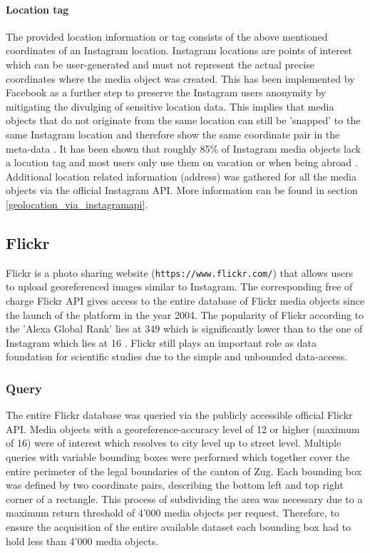 \paragraph{Location tag} \label{instagram_location_tag}
The provided location information or tag consists of the above mentioned coordinates of an Instagram location. Instagram locations are points of interest which can be user-generated and must not represent the actual precise coordinates where the media object was created. This has been implemented by Facebook as a further step to preserve the Instagram users anonymity by mitigating the divulging of sensitive location data. This implies that media objects that do not originate from the same location can still be 'snapped' to the same Instagram location and therefore show the same coordinate pair in the meta-data \parencite{Instagram}.
It has been shown that roughly 85\% of Instagram media objects lack a location tag and most users only use them on vacation or when being abroad \parencite{Flatow2015}.
Additional location related information (address) was gathered for all the media objects via the official Instagram API. More information can be found in section \ref{geolocation_via_instagramapi}.

\subsection{Flickr} \label{flickr}
Flickr is a photo sharing website (\texttt{https://www.flickr.com/}) that allows users to upload georeferenced images similar to Instagram. The corresponding free of charge Flickr API gives access to the entire database of Flickr media objects since the launch of the platform in the year 2004. The popularity of Flickr according to the 'Alexa Global Rank' lies at 349 \parencite{Alexa.com2019a} which is significantly lower than to the one of Instagram which lies at 16 \parencite{Alexa.com2019}. Flickr still plays an important role as data foundation for scientific studies due to the simple and unbounded data-access. 
\subsubsection{Query} \label{flickr_query}
The entire Flickr database was queried via the publicly accessible official Flickr API. Media objects with a georeference-accuracy level of 12 or higher (maximum of 16) were of interest which resolves to city level up to street level. Multiple queries with variable bounding boxes were performed which together cover the entire perimeter of the legal boundaries of the canton of Zug. Each bounding box was defined by two coordinate pairs, describing the bottom left and top right corner of a rectangle. This process of subdividing the area was necessary due to a maximum return threshold of 4'000 media objects per request. Therefore, to ensure the acquisition of the entire available dataset each bounding box had to hold less than 4'000 media objects.

